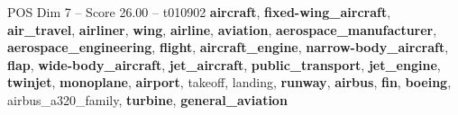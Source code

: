 \begin{textsample}{POS Dim 7 – Score 26.00 – t010902}  \label{ex:f7_pos_007}
\textbf{aircraft}, \textbf{fixed-wing\_aircraft}, \textbf{air\_travel}, \textbf{airliner}, \textbf{wing}, \textbf{airline}, \textbf{aviation}, \textbf{aerospace\_manufacturer}, \textbf{aerospace\_engineering}, \textbf{flight}, \textbf{aircraft\_engine}, \textbf{narrow-body\_aircraft}, \textbf{flap}, \textbf{wide-body\_aircraft}, \textbf{jet\_aircraft}, \textbf{public\_transport}, \textbf{jet\_engine}, \textbf{twinjet}, \textbf{monoplane}, \textbf{airport}, takeoff, landing, \textbf{runway}, \textbf{airbus}, \textbf{fin}, \textbf{boeing}, airbus\_a320\_family, \textbf{turbine}, \textbf{general\_aviation}

\end{textsample}
